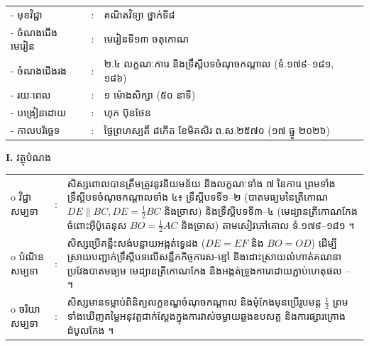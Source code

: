 \documentclass[a4paper,10pt]{article}
\newcommand{\wcirc}{{\CourierBullet\fontsize{9.5pt}{11pt}\selectfont o}}
\newcommand{\cnum}[1]{{\fontsize{10.5pt}{12pt}\selectfont\ding{\numexpr171+#1\relax}}\hspace{0.2em}}
\begin{document}
{\renewcommand{\arraystretch}{0.95}
\hspace*{4.05cm}%
\begin{tabular}{@{}l l l@{}}
  - \hspace{0.35cm} មុខវិជ្ជា & : & គណិតវិទ្យា ថ្នាក់ទី៨ \\
  - \hspace{0.35cm} ចំណងជើងមេរៀន & : & មេរៀនទី១៣ ចតុកោណ \\
  - \hspace{0.35cm} ចំណងជើងរង & : & ២.៤ លក្ខណៈការេ និងទ្រឹស្ដីបទចំណុចកណ្ដាល (ទំ.១៧៩--១៨១, ១៨៦) \\
  - \hspace{0.35cm} រយៈពេល & : & ១ ម៉ោងសិក្សា (៥០ នាទី) \\
  - \hspace{0.35cm} បង្រៀនដោយ & : & ហុក ប៊ុនថែន \\
  - \hspace{0.35cm} កាលបរិច្ឆេទ & : & ថ្ងៃព្រហស្បតិ៍ ៨កើត ខែមិគសិរ ព.ស.២៥៧០ (១៧ ធ្នូ ២០២៦) \\
\end{tabular}

\vspace{1pt}

\textbf{I.} {\muol វត្ថុបំណង}\\[1pt]
\hspace*{0.55cm}%
\begin{tabular}{@{}l l L{14.2cm}@{}}
  \wcirc \hspace{0.25cm} វិជ្ជាសម្បទា & : & សិស្សពោលបានត្រឹមត្រូវនូវនិយមន័យ និងលក្ខណៈទាំង ៧ នៃការេ ព្រមទាំងទ្រឹស្ដីបទចំណុចកណ្ដាលទាំង ៤៖ ទ្រឹស្ដីបទទី១--២ (បាតមធ្យមនៃត្រីកោណ $DE\parallel BC, DE=\frac{1}{2}BC$ និងច្រាស) និងទ្រឹស្ដីបទទី៣--៤ (មេដ្យានត្រីកោណកែងចំពោះអ៊ីប៉ូតេនុស $BO=\frac{1}{2}AC$ និងច្រាស) តាមសៀវភៅគោល ទំ.១៧៩--១៨១ ។ \\
  \wcirc \hspace{0.25cm} បំណិនសម្បទា & : & សិស្សប្រើគន្លឹះសង់បន្លាយអង្កត់ទ្វេដង ($DE=EF$ និង $BO=OD$) ដើម្បីស្រាយបញ្ជាក់ទ្រឹស្ដីបទលើសន្លឹកកិច្ចការស-ខ្មៅ និងដោះស្រាយលំហាត់គណនាប្រវែងបាតមធ្យម មេដ្យានត្រីកោណកែង និងអង្កត់ទ្រូងការេដោយភ្ជាប់ហេតុផល \cnum{1}--\cnum{5} ។ \\
  \wcirc \hspace{0.25cm} ចរិយាសម្បទា & : & សិស្សមានទម្លាប់ពិនិត្យលក្ខខណ្ឌចំណុចកណ្ដាល និងមុំកែងមុនប្រើរូបមន្ត $\frac{1}{2}$ ព្រមទាំងឃើញតម្លៃអនុវត្តជាក់ស្ដែងក្នុងការវាស់ចម្ងាយឆ្លងឧបសគ្គ និងការផ្សារគ្រោងដំបូលកែង ។ \\
\end{tabular}

}
\end{document}
